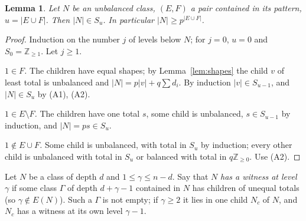 \documentclass[11pt,a4paper]{amsart}
\newtheorem{lemma}[theorem]{Lemma}
\theoremstyle{definition}
\theoremstyle{remark}
\newcommand{\Z}{\mathbb{Z}}
\begin{document}
\begin{lemma}\label{lem:S}
Let $N$ be an unbalanced class, $(E,F)$ a pair contained in its pattern, $u=|E\cup F|$. Then $|N|\in S_u$. In
particular $|N|\ge p^{|E\cup F|}$.
\end{lemma}
\begin{proof}
Induction on the number $j$ of levels below $N$; for $j=0$, $u=0$ and $S_0=\Z_{\ge1}$. Let $j\ge1$.

\emph{$1\in F$.} The children have equal shapes; by Lemma~\ref{lem:shapes} the child $v$ of least total is
unbalanced and $|N|=p|v|+q\sum d_i$. By induction $|v|\in S_{u-1}$, and $|N|\in S_u$ by (A1), (A2).

\emph{$1\in E\setminus F$.} The children have one total $s$, some child is unbalanced, $s\in S_{u-1}$ by
induction, and $|N|=ps\in S_u$.

\emph{$1\notin E\cup F$.} Some child is unbalanced, with total in $S_u$ by induction; every other child is
unbalanced with total in $S_u$ or balanced with total in $q\Z_{\ge0}$. Use (A2).
\end{proof}

Let $N$ be a class of depth $d$ and $1\le \gamma\le n-d$. Say that $N$ \emph{has a witness at level $\gamma$} if some
class $\Gamma$ of depth $d+\gamma-1$ contained in $N$ has children of unequal totals (so $\gamma\notin E(N)$). Such a
$\Gamma$ is not empty; if $\gamma\ge2$ it lies in one child $N_c$ of $N$, and $N_c$ has a witness at its own level
$\gamma-1$.
\end{document}
